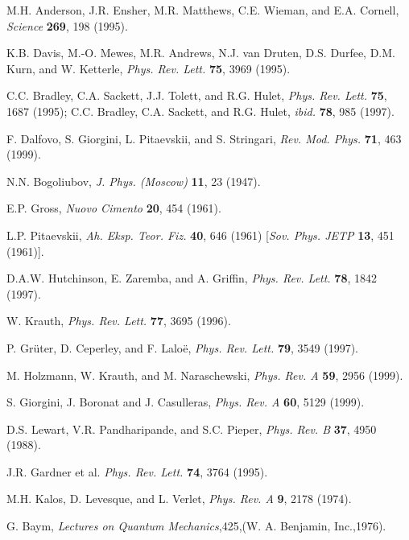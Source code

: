 \documentclass[aps,pra,twocolumn,groupedaddress]{revtex4}
\begin{document}
\begin{thebibliography}{999}%
\footnotesize

M.H. Anderson, J.R. Ensher, M.R. Matthews, C.E. Wieman, and E.A. Cornell, {\em Science} {\bf
269}, 198 (1995).

K.B. Davis, M.-O. Mewes, M.R. Andrews, N.J. van Druten, D.S. Durfee, D.M. Kurn, and W. Ketterle,
{\em Phys. Rev. Lett.} {\bf 75}, 3969 (1995).

C.C. Bradley, C.A. Sackett, J.J. Tolett, and R.G. Hulet, {\em Phys. Rev. Lett.} {\bf 75}, 1687
(1995); C.C. Bradley, C.A. Sackett, and R.G. Hulet, {\em ibid.} {\bf 78}, 985 (1997).

F. Dalfovo, S. Giorgini, L. Pitaevskii, and S. Stringari, {\em Rev. Mod. Phys.} {\bf 71}, 463
(1999).

N.N. Bogoliubov, {\em J. Phys. (Moscow)} {\bf 11}, 23 (1947).

E.P. Gross, {\em Nuovo Cimento} {\bf 20}, 454 (1961).

L.P. Pitaevskii, {\em Ah. Eksp. Teor. Fiz.} {\bf 40}, 646 (1961) [{\em Sov. Phys. JETP} {\bf 13},
451 (1961)].

D.A.W. Hutchinson, E. Zaremba, and A. Griffin, {\em Phys. Rev. Lett.} {\bf 78}, 1842 (1997).

W. Krauth, {\em Phys. Rev. Lett.} {\bf 77}, 3695 (1996).

P. Gr\"{u}ter, D. Ceperley, and F. Lalo\"{e}, {\em Phys. Rev. Lett.} {\bf 79}, 3549 (1997).

M. Holzmann, W. Krauth, and M. Naraschewski, {\em Phys. Rev. A} {\bf 59}, 2956 (1999).

S. Giorgini, J. Boronat and J. Casulleras, {\em Phys. Rev. A} {\bf 60}, 5129 (1999). 

D.S. Lewart, V.R. Pandharipande, and S.C. Pieper, {\em Phys. Rev. B} {\bf 37}, 4950 (1988).

J.R. Gardner et al. {\em Phys. Rev. Lett.} {\bf 74}, 3764 (1995).

M.H. Kalos, D. Levesque, and L. Verlet, {\em Phys. Rev. A} {\bf 9}, 2178 (1974).

G. Baym, {\em Lectures on Quantum Mechanics},425,(W. A. Benjamin, Inc.,1976).


\end{thebibliography}
\end{document}
